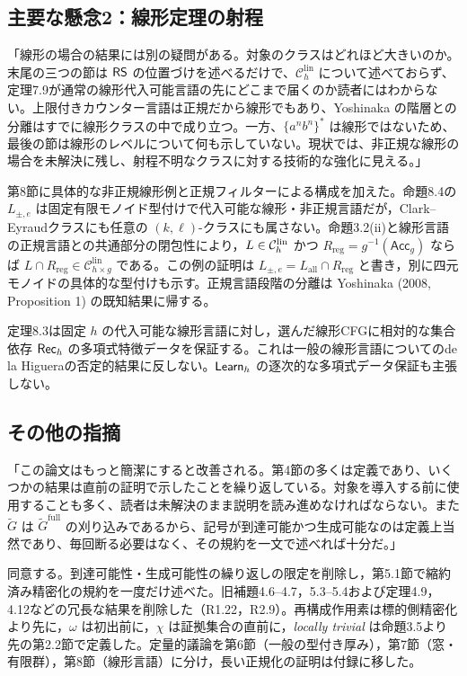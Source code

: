 \subsection*{主要な懸念2：線形定理の射程}
「線形の場合の結果には別の疑問がある。対象のクラスはどれほど大きいのか。末尾の三つの節は $\mathsf{RS}$ の位置づけを述べるだけで、$\mathcal C_h^{\mathrm{lin}}$ について述べておらず、定理7.9が通常の線形代入可能言語の先にどこまで届くのか読者にはわからない。上限付きカウンター言語は正規だから線形でもあり、Yoshinaka の階層との分離はすでに線形クラスの中で成り立つ。一方、$\{a^nb^n\}^*$ は線形ではないため、最後の節は線形のレベルについて何も示していない。現状では、非正規な線形の場合を未解決に残し、射程不明なクラスに対する技術的な強化に見える。」

\Reply
第8節に具体的な非正規線形例と正規フィルターによる構成を加えた。命題8.4の $L_{\pm,e}$ は固定有限モノイド型付けで代入可能な線形・非正規言語だが，Clark--Eyraudクラスにも任意の $(k,\ell)$-クラスにも属さない。命題3.2(ii)と線形言語の正規言語との共通部分の閉包性により，$L\in\mathcal C_h^{\mathrm{lin}}$ かつ $R_{\mathrm{reg}}=g^{-1}(\mathsf{Acc}_g)$ ならば $L\cap R_{\mathrm{reg}}\in\mathcal C_{h\times g}^{\mathrm{lin}}$ である。この例の証明は $L_{\pm,e}=L_{\mathrm{all}}\cap R_{\mathrm{reg}}$ と書き，別に四元モノイドの具体的な型付けも示す。正規言語段階の分離は Yoshinaka (2008, Proposition 1) の既知結果に帰する。

定理8.3は固定 $h$ の代入可能な線形言語に対し，選んだ線形CFGに相対的な集合依存 $\mathsf{Rec}_h$ の多項式特徴データを保証する。これは一般の線形言語についてのde la Higueraの否定的結果に反しない。$\mathsf{Learn}_h$ の逐次的な多項式データ保証も主張しない。

\subsection*{その他の指摘}
「この論文はもっと簡潔にすると改善される。第4節の多くは定義であり、いくつかの結果は直前の証明で示したことを繰り返している。対象を導入する前に使用することも多く、読者は未解決のまま説明を読み進めなければならない。また $\widetilde G$ は $\widetilde G^{\mathrm{full}}$ の刈り込みであるから、記号が到達可能かつ生成可能なのは定義上当然であり、毎回断る必要はなく、その規約を一文で述べれば十分だ。」

\Reply
同意する。到達可能性・生成可能性の繰り返しの限定を削除し，第5.1節で縮約済み精密化の規約を一度だけ述べた。旧補題4.6--4.7，5.3--5.4および定理4.9，4.12などの冗長な結果を削除した（R1.22，R2.9）。再構成作用素は標的側精密化より先に，$\omega$ は初出前に，$\chi$ は証拠集合の直前に，\emph{locally trivial} は命題3.5より先の第2.2節で定義した。定量的議論を第6節（一般の型付き厚み），第7節（窓・有限群），第8節（線形言語）に分け，長い正規化の証明は付録に移した。

